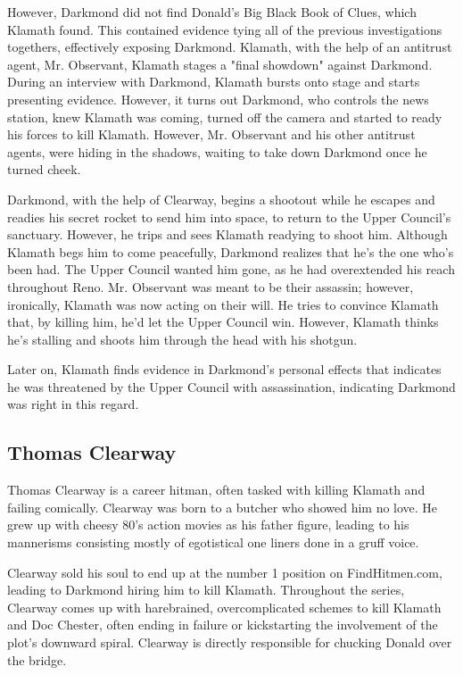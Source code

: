 \documentclass{article}
\begin{document}
However, Darkmond did not find Donald's Big Black Book of Clues, which Klamath found. This contained evidence tying all of the previous investigations togethers, effectively exposing Darkmond. Klamath, with the help of an antitrust agent, Mr. Observant, Klamath stages a "final showdown" against Darkmond. During an interview with Darkmond, Klamath bursts onto stage and starts presenting evidence. However, it turns out Darkmond, who controls the news station, knew Klamath was coming, turned off the camera and started to ready his forces to kill Klamath. However, Mr. Observant and his other antitrust agents, were hiding in the shadows, waiting to take down Darkmond once he turned cheek. 

Darkmond, with the help of Clearway, begins a shootout while he escapes and readies his secret rocket to send him into space, to return to the Upper Council's sanctuary. However, he trips and sees Klamath readying to shoot him. Although Klamath begs him to come peacefully, Darkmond realizes that he's the one who's been had. The Upper Council wanted him gone, as he had overextended his reach throughout Reno. Mr. Observant was meant to be their assassin; however, ironically, Klamath was now acting on their will. He tries to convince Klamath that, by killing him, he'd let the Upper Council win. However, Klamath thinks he's stalling and shoots him through the head with his shotgun.

Later on, Klamath finds evidence in Darkmond's personal effects that indicates he was threatened by the Upper Council with assassination, indicating Darkmond was right in this regard.

\subsection{Thomas Clearway}

Thomas Clearway is a career hitman, often tasked with killing Klamath and failing comically. Clearway was born to a butcher who showed him no love. He grew up with cheesy 80's action movies as his father figure, leading to his mannerisms consisting mostly of egotistical one liners done in a gruff voice.

Clearway sold his soul to end up at the number 1 position on FindHitmen.com, leading to Darkmond hiring him to kill Klamath. Throughout the series, Clearway comes up with harebrained, overcomplicated schemes to kill Klamath and Doc Chester, often ending in failure or kickstarting the involvement of the plot's downward spiral. Clearway is directly responsible for chucking Donald over the bridge.
\end{document}
